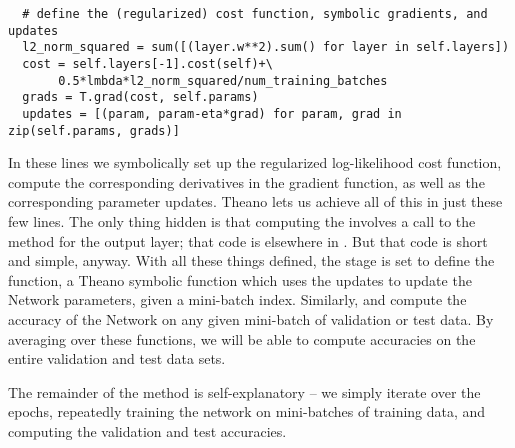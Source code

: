 \documentclass[a4paper,twoside,10pt]{book}
\begin{document}
\begin{lstlisting}
  # define the (regularized) cost function, symbolic gradients, and updates
  l2_norm_squared = sum([(layer.w**2).sum() for layer in self.layers])
  cost = self.layers[-1].cost(self)+\
       0.5*lmbda*l2_norm_squared/num_training_batches
  grads = T.grad(cost, self.params)
  updates = [(param, param-eta*grad) for param, grad in zip(self.params, grads)]
\end{lstlisting}
In these lines we symbolically set up the regularized log-likelihood cost function, compute the corresponding derivatives in the gradient function, as well as the corresponding parameter updates. Theano lets us achieve all of this in just these few lines. The only thing hidden is that computing the  involves a call to the  method for the output layer; that code is elsewhere in . But that code is short and simple, anyway. With all these things defined, the stage is set to define the  function, a Theano symbolic function which uses the updates to update the Network parameters, given a mini-batch index. Similarly,  and  compute the accuracy of the Network on any given mini-batch of validation or test data. By averaging over these functions, we will be able to compute accuracies on the entire validation and test data sets.

The remainder of the  method is self-explanatory -- we simply iterate over the epochs, repeatedly training the network on mini-batches of training data, and computing the validation and test accuracies.
\end{document}
